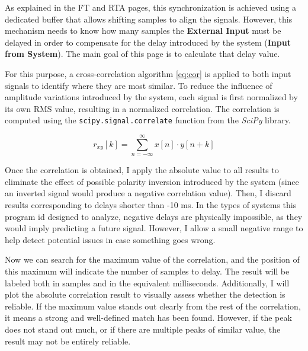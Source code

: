 As explained in the FT and RTA pages, this synchronization is achieved using a dedicated buffer that allows shifting samples to align the signals. However, this mechanism needs to know how many samples the \textbf{External Input} must be delayed in order to compensate for the delay introduced by the system (\textbf{Input from System}). The main goal of this page is to calculate that delay value.

For this purpose, a cross-correlation algorithm \ref{eq:cor} is applied to both input signals to identify where they are most similar. To reduce the influence of amplitude variations introduced by the system, each signal is first normalized by its own RMS value, resulting in a normalized correlation. The correlation is computed using the \texttt{scipy.signal.correlate} function from the \textit{SciPy} library.

\begin{equation}
	\label{eq:cor}
	r_{xy}[k] = \sum_{n=-\infty}^{\infty} x[n] \cdot y[n + k]
\end{equation}


Once the correlation is obtained, I apply the absolute value to all results to eliminate the effect of possible polarity inversion introduced by the system (since an inverted signal would produce a negative correlation value). Then, I discard results corresponding to delays shorter than -10 ms. In the types of systems this program id designed to analyze, negative delays are physically impossible, as they would imply predicting a future signal. However, I allow a small negative range to help detect potential issues in case something goes wrong.

Now we can search for the maximum value of the correlation, and the position of this maximum will indicate the number of samples to delay. The result will be labeled both in samples and in the equivalent milliseconds. Additionally, I will plot the absolute correlation result to visually assess whether the detection is reliable. If the maximum value stands out clearly from the rest of the correlation, it means a strong and well-defined match has been found. However, if the peak does not stand out much, or if there are multiple peaks of similar value, the result may not be entirely reliable.

